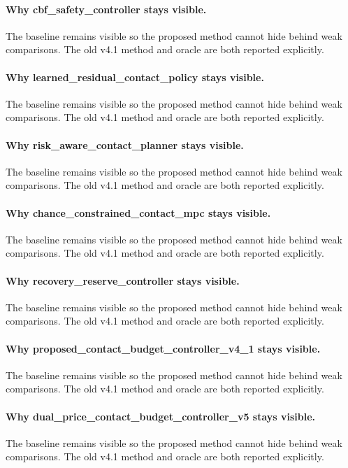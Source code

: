 \documentclass{article}
\begin{document}
\paragraph{Why cbf\_safety\_controller stays visible.} The baseline remains visible so the proposed method cannot hide behind weak comparisons. The old v4.1 method and oracle are both reported explicitly.
\paragraph{Why learned\_residual\_contact\_policy stays visible.} The baseline remains visible so the proposed method cannot hide behind weak comparisons. The old v4.1 method and oracle are both reported explicitly.
\paragraph{Why risk\_aware\_contact\_planner stays visible.} The baseline remains visible so the proposed method cannot hide behind weak comparisons. The old v4.1 method and oracle are both reported explicitly.
\paragraph{Why chance\_constrained\_contact\_mpc stays visible.} The baseline remains visible so the proposed method cannot hide behind weak comparisons. The old v4.1 method and oracle are both reported explicitly.
\paragraph{Why recovery\_reserve\_controller stays visible.} The baseline remains visible so the proposed method cannot hide behind weak comparisons. The old v4.1 method and oracle are both reported explicitly.
\paragraph{Why proposed\_contact\_budget\_controller\_v4\_1 stays visible.} The baseline remains visible so the proposed method cannot hide behind weak comparisons. The old v4.1 method and oracle are both reported explicitly.
\paragraph{Why dual\_price\_contact\_budget\_controller\_v5 stays visible.} The baseline remains visible so the proposed method cannot hide behind weak comparisons. The old v4.1 method and oracle are both reported explicitly.
\end{document}
